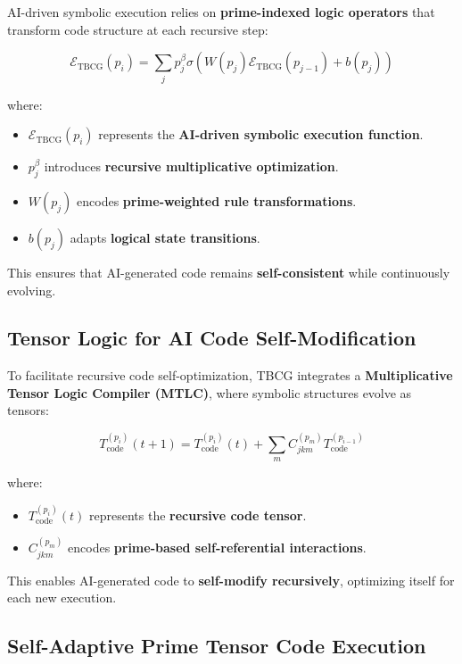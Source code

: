 \documentclass{article}
\theoremstyle{plain}
\theoremstyle{plain}
\theoremstyle{definition}
\theoremstyle{remark}
\begin{document}
AI-driven symbolic execution relies on \textbf{prime-indexed logic operators} that transform code structure at each recursive step:

\begin{equation}
\mathcal{E}_{\text{TBCG}}(p_i) = \sum_{j} p_j^{\beta} \sigma (W(p_j) \mathcal{E}_{\text{TBCG}}(p_{j-1}) + b(p_j))
\end{equation}

where:
\begin{itemize}
    \item $\mathcal{E}_{\text{TBCG}}(p_i)$ represents the \textbf{AI-driven symbolic execution function}.
    \item $p_j^{\beta}$ introduces \textbf{recursive multiplicative optimization}.
    \item $W(p_j)$ encodes \textbf{prime-weighted rule transformations}.
    \item $b(p_j)$ adapts \textbf{logical state transitions}.
\end{itemize}

This ensures that AI-generated code remains \textbf{self-consistent} while continuously evolving.

\subsection{Tensor Logic for AI Code Self-Modification}

To facilitate recursive code self-optimization, TBCG integrates a \textbf{Multiplicative Tensor Logic Compiler (MTLC)}, where symbolic structures evolve as tensors:

\begin{equation}
T_{\text{code}}^{(p_i)}(t+1) = T_{\text{code}}^{(p_i)}(t) + \sum_{m} C_{jkm}^{(p_m)} T_{\text{code}}^{(p_{i-1})}
\end{equation}

where:
\begin{itemize}
    \item $T_{\text{code}}^{(p_i)}(t)$ represents the \textbf{recursive code tensor}.
    \item $C_{jkm}^{(p_m)}$ encodes \textbf{prime-based self-referential interactions}.
\end{itemize}

This enables AI-generated code to \textbf{self-modify recursively}, optimizing itself for each new execution.

\subsection{Self-Adaptive Prime Tensor Code Execution}
\end{document}
